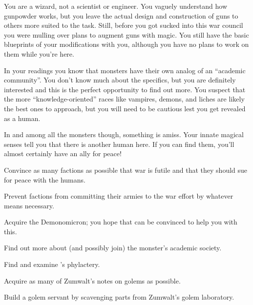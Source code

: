 \documentclass[char]{guildcamp2}
\begin{document}

You are a wizard, not a scientist or engineer. You vaguely understand how gunpowder works, but you leave the actual design and construction of guns to others more suited to the task. Still, before you got sucked into this war council you were mulling over plans to augment guns with magic. You still have the basic blueprints of your modifications with you, although you have no plans to work on them while you're here.

In your readings you know that monsters have their own analog of an ``academic community''. You don't know much about the specifics, but you are definitely interested and this is the perfect opportunity to find out more. You suspect that the more ``knowledge-oriented'' races like vampires, demons, and liches are likely the best ones to approach, but you will need to be cautious lest you get revealed as a human.

In and among all the monsters though, something is amiss. Your innate magical senses tell you that there is another human here. If you can find them, you'll almost certainly have an ally for peace!

\begin{itemz}[Goals]
  \item Convince as many factions as possible that war is futile and that they should sue for peace with the humans.
  \item Prevent factions from committing their armies to the war effort by whatever means necessary.
  \item Acquire the Demonomicron; you hope that \cDemon{} can be convinced to help you with this.
  \item Find out more about (and possibly join) the monster's academic society.
  \item Find and examine \cLich{}'s phylactery.
  \item Acquire as many of Zumwalt's notes on golems as possible.
  \item Build a golem servant by scavenging parts from Zumwalt's golem laboratory.
\end{itemz}
\end{document}
